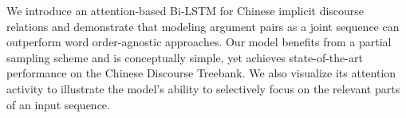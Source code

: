 We introduce an attention-based Bi-LSTM for Chinese implicit discourse relations and demonstrate that modeling argument pairs as a joint sequence can outperform word order-agnostic approaches. Our model benefits from a partial sampling scheme and is conceptually simple, yet achieves state-of-the-art performance on the Chinese Discourse Treebank. We also visualize its attention activity to illustrate the model's ability to selectively focus on the relevant parts of an input sequence.
